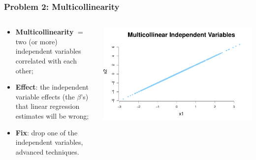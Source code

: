 \documentclass[aspectratio=169]{beamer}
\theoremstyle{principle}
\begin{document}
\begin{frame}
\frametitle{Problem 2: Multicollinearity}

\begin{columns}
\begin{column}{0.5\textwidth}

\begin{itemize}
\item \textbf{Multicollinearity} $=$ two (or more) independent variables correlated with each other;
\bigskip
\bigskip

\item \textbf{Effect}: the independent variable effects (the $\beta$'s) that linear regression estimates will be wrong;
\bigskip
\bigskip

\item \textbf{Fix}: drop one of the independent variables, advanced techniques.

\end{itemize}

\end{column}
\begin{column}{0.5\textwidth}
\begin{center}
\includegraphics[scale=0.35]{multicollinearity.pdf}
\end{center}
\end{column}
\end{columns}

\end{frame}
\end{document}

